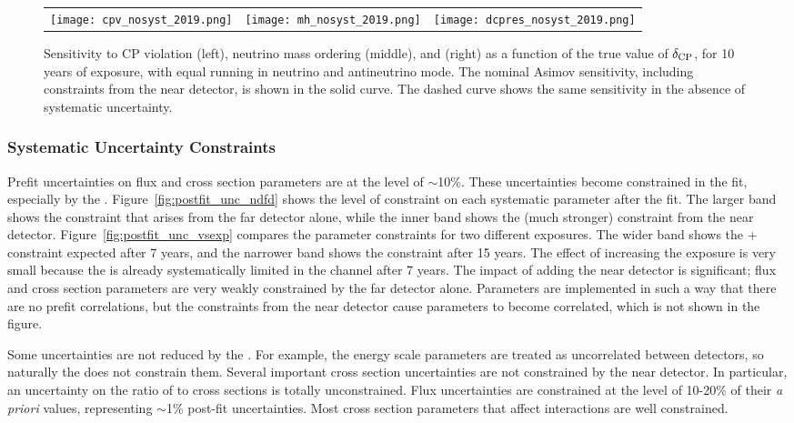 \begin{figure}[h!]
    \centering
    \begin{tabular}{ccc}
		\texttt{[image: cpv\_nosyst\_2019.png]} &
		\texttt{[image: mh\_nosyst\_2019.png]} &
		\texttt{[image: dcpres\_nosyst\_2019.png]}
	\end{tabular}
	\caption[Sensitivity to CP violation, neutrino mass ordering, and \deltacp, as a function of  $\deltacp$]{Sensitivity to CP violation (left), neutrino mass ordering (middle), and \deltacp (right) as a function of the true value of $\deltacp$, for 10 years of exposure, with equal running in neutrino and antineutrino mode. The nominal Asimov sensitivity, including constraints from the near detector, is shown in the solid curve. The dashed curve shows the same sensitivity in the absence of systematic uncertainty.}
    \label{fig:results_systs}
\end{figure}

\subsubsection{Systematic Uncertainty Constraints}

Prefit uncertainties on flux and cross section parameters are at the level of $\sim$10\%. These uncertainties become constrained in the fit, especially by the . Figure~\ref{fig:postfit_unc_ndfd} shows the level of constraint on each systematic parameter after the fit. The larger band shows the constraint that arises from the far detector alone, while the inner band shows the (much stronger) constraint from the near detector. Figure~\ref{fig:postfit_unc_vsexp} compares the parameter constraints for two different exposures. The wider band shows the + constraint expected after 7 years, and the narrower band shows the constraint after 15 years. The effect of increasing the exposure is very small because the  is already systematically limited in the \numu {} channel after 7 years. The impact of adding the near detector is significant; flux and cross section parameters are very weakly constrained by the far detector alone. Parameters are implemented in such a way that there are no prefit correlations, but the constraints from the near detector cause parameters to become correlated, which is not shown in the figure.

Some uncertainties are not reduced by the . For example, the energy scale parameters are treated as uncorrelated between detectors, so naturally the  does not constrain them. Several important cross section uncertainties are not constrained by the near detector. In particular, an uncertainty on the ratio of \numu to \nue cross sections is totally unconstrained. Flux uncertainties are constrained at the level of 10-20\% of their \textit{a priori} values, representing $\sim$1\% post-fit uncertainties. Most cross section parameters that affect  interactions are well constrained.

